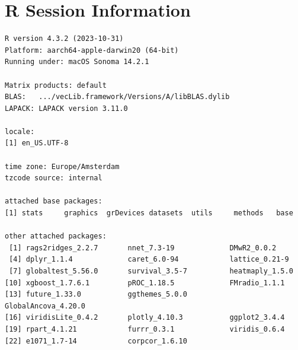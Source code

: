 \documentclass{amsart}
\begin{document}
\section{R Session Information}

\begin{verbatim}
R version 4.3.2 (2023-10-31)
Platform: aarch64-apple-darwin20 (64-bit)
Running under: macOS Sonoma 14.2.1

Matrix products: default
BLAS:   .../vecLib.framework/Versions/A/libBLAS.dylib 
LAPACK: LAPACK version 3.11.0

locale:
[1] en_US.UTF-8

time zone: Europe/Amsterdam
tzcode source: internal

attached base packages:
[1] stats     graphics  grDevices datasets  utils     methods   base     

other attached packages:
 [1] rags2ridges_2.2.7       nnet_7.3-19             DMwR2_0.0.2                       
 [4] dplyr_1.1.4             caret_6.0-94            lattice_0.21-9                    
 [7] globaltest_5.56.0       survival_3.5-7          heatmaply_1.5.0               
[10] xgboost_1.7.6.1         pROC_1.18.5             FMradio_1.1.1       
[13] future_1.33.0           ggthemes_5.0.0          GlobalAncova_4.20.0 
[16] viridisLite_0.4.2       plotly_4.10.3           ggplot2_3.4.4
[19] rpart_4.1.21            furrr_0.3.1             viridis_0.6.4 
[22] e1071_1.7-14            corpcor_1.6.10


\end{verbatim}
\end{document}
